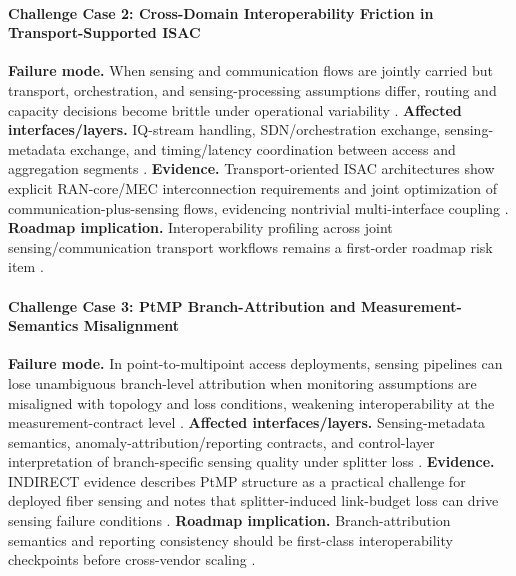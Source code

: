 \documentclass[letterpaper,journal]{IEEEtran}
\begin{document}
\paragraph{Challenge Case 2: Cross-Domain Interoperability Friction in Transport-Supported ISAC}
\textbf{Failure mode.} When sensing and communication flows are jointly carried but transport, orchestration, and sensing-processing assumptions differ, routing and capacity decisions become brittle under operational variability \cite{O_ISAC_025}. \textbf{Affected interfaces/layers.} IQ-stream handling, SDN/orchestration exchange, sensing-metadata exchange, and timing/latency coordination between access and aggregation segments \cite{O_ISAC_025}. \textbf{Evidence.} Transport-oriented ISAC architectures show explicit RAN-core/MEC interconnection requirements and joint optimization of communication-plus-sensing flows, evidencing nontrivial multi-interface coupling \cite{O_ISAC_025}. \textbf{Roadmap implication.} Interoperability profiling across joint sensing/communication transport workflows remains a first-order roadmap risk item \cite{O_ISAC_025}.

\paragraph{Challenge Case 3: PtMP Branch-Attribution and Measurement-Semantics Misalignment}
\textbf{Failure mode.} In point-to-multipoint access deployments, sensing pipelines can lose unambiguous branch-level attribution when monitoring assumptions are misaligned with topology and loss conditions, weakening interoperability at the measurement-contract level \cite{O_ISAC_104}. \textbf{Affected interfaces/layers.} Sensing-metadata semantics, anomaly-attribution/reporting contracts, and control-layer interpretation of branch-specific sensing quality under splitter loss \cite{O_ISAC_104}. \textbf{Evidence.} INDIRECT evidence describes PtMP structure as a practical challenge for deployed fiber sensing and notes that splitter-induced link-budget loss can drive sensing failure conditions \cite{O_ISAC_104}. \textbf{Roadmap implication.} Branch-attribution semantics and reporting consistency should be first-class interoperability checkpoints before cross-vendor scaling \cite{O_ISAC_104}.
\end{document}
